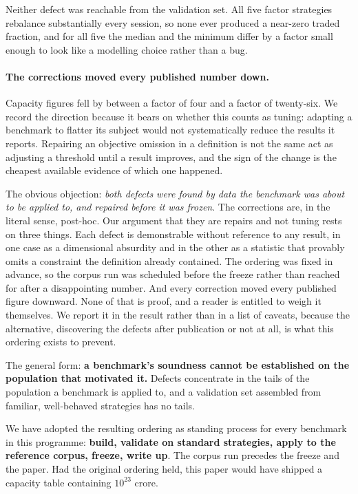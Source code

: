 \documentclass[11pt,a4paper]{article}
\begin{document}
Neither defect was reachable from the validation set. All five factor strategies rebalance
substantially every session, so none ever produced a near-zero traded fraction, and for all five the
median and the minimum differ by a factor small enough to look like a modelling choice rather than a
bug.

\paragraph{The corrections moved every published number down.} Capacity figures fell by between a
factor of four and a factor of twenty-six. We record the direction because it bears on whether this
counts as tuning: adapting a benchmark to flatter its subject would not systematically reduce the
results it reports. Repairing an objective omission in a definition is not the same act as adjusting
a threshold until a result improves, and the sign of the change is the cheapest available evidence
of which one happened.

The obvious objection: \emph{both defects were found by data the benchmark was about to be applied
to, and repaired before it was frozen}. The corrections are, in the literal sense, post-hoc. Our
argument that they are repairs and not tuning rests on three things. Each defect is demonstrable
without reference to any result, in one case as a dimensional absurdity and in the other as a
statistic that provably omits a constraint the definition already contained. The ordering was fixed
in advance, so the corpus run was scheduled before the freeze rather than reached for after a
disappointing number. And every correction moved every published figure downward. None of that is
proof, and a reader is entitled to weigh it themselves. We report it in the result rather than in a
list of caveats, because the alternative, discovering the defects after publication or not at all,
is what this ordering exists to prevent.

\begin{finding}
The general form: \textbf{a benchmark's soundness cannot be established on the population that
motivated it.} Defects concentrate in the tails of the population a benchmark is applied to, and a
validation set assembled from familiar, well-behaved strategies has no tails.
\end{finding}

We have adopted the resulting ordering as standing process for every benchmark in this programme:
\textbf{build, validate on standard strategies, apply to the reference corpus, freeze, write up}.
The corpus run precedes the freeze and the paper. Had the original ordering held, this paper would
have shipped a capacity table containing $10^{23}$ crore.
\end{document}
